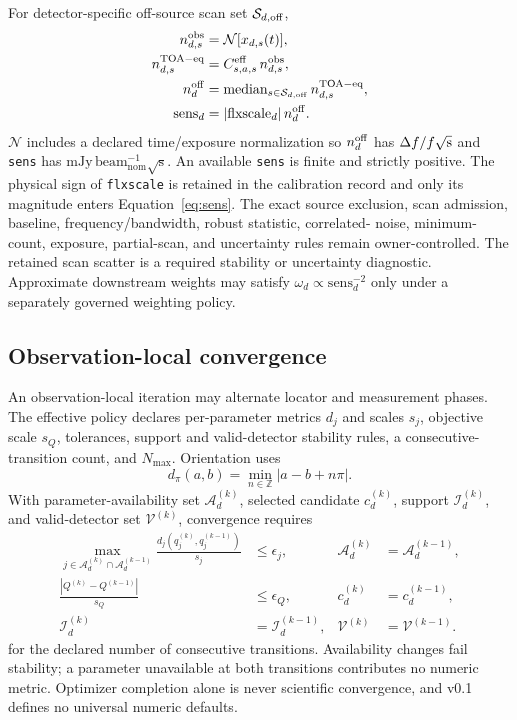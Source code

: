 For detector-specific off-source scan set $\mathcal S_{d,\rm off}$,
\begin{align}
n_{d,s}^{\rm obs}&=\mathcal N[x_{d,s}(t)],\\
n_{d,s}^{\rm TOA-eq}&=C^{\rm eff}_{s,a,s}\,n_{d,s}^{\rm obs},\\
n_d^{\rm off}&=\operatorname{median}_{s\in\mathcal S_{d,\rm off}}
n_{d,s}^{\rm TOA-eq},\\
\mathrm{sens}_d&=|\mathrm{flxscale}_d|\,n_d^{\rm off}.
\label{eq:sens}
\end{align}
$\mathcal N$ includes a declared time/exposure normalization so
$n_d^{\rm off}$ has $\Delta f/f\sqrt{\rm s}$ and \texttt{sens} has
$\mathrm{mJy\,beam_{nom}^{-1}\sqrt{s}}$. An available \texttt{sens} is finite
and strictly positive. The physical sign of \texttt{flxscale} is retained in
the calibration record and only its magnitude enters Equation~\ref{eq:sens}.
The exact source exclusion,
scan admission, baseline, frequency/bandwidth, robust statistic, correlated-
noise, minimum-count, exposure, partial-scan, and uncertainty rules remain
owner-controlled. The retained scan scatter is a required stability or
uncertainty diagnostic. Approximate downstream weights may satisfy
$\omega_d\propto\mathrm{sens}_d^{-2}$ only under a separately governed
weighting policy.

\subsection{Observation-local convergence}

An observation-local iteration may alternate locator and measurement phases.
The effective policy declares per-parameter metrics $d_j$ and scales $s_j$,
objective scale $s_Q$, tolerances, support and valid-detector stability rules,
a consecutive-transition count, and $N_{\max}$. Orientation uses
\[
d_\pi(a,b)=\min_{n\in\mathbb Z}|a-b+n\pi|.
\]
With parameter-availability set $\mathcal A_d^{(k)}$, selected candidate
$c_d^{(k)}$, support $\mathcal I_d^{(k)}$, and valid-detector set
$\mathcal V^{(k)}$, convergence requires
\begin{equation}
\begin{aligned}
\max_{j\in\mathcal A_d^{(k)}\cap\mathcal A_d^{(k-1)}}
\frac{d_j(q_j^{(k)},q_j^{(k-1)})}{s_j}&\le\epsilon_j,
&\mathcal A_d^{(k)}&=\mathcal A_d^{(k-1)},\\
\frac{|Q^{(k)}-Q^{(k-1)}|}{s_Q}&\le\epsilon_Q,
&c_d^{(k)}&=c_d^{(k-1)},\\
\mathcal I_d^{(k)}&=\mathcal I_d^{(k-1)},
&\mathcal V^{(k)}&=\mathcal V^{(k-1)}.
\end{aligned}
\label{eq:convergence}
\end{equation}
for the declared number of consecutive transitions. Availability changes fail
stability; a parameter unavailable at both transitions contributes no numeric
metric. Optimizer completion alone is never scientific convergence, and v0.1
defines no universal numeric defaults.
